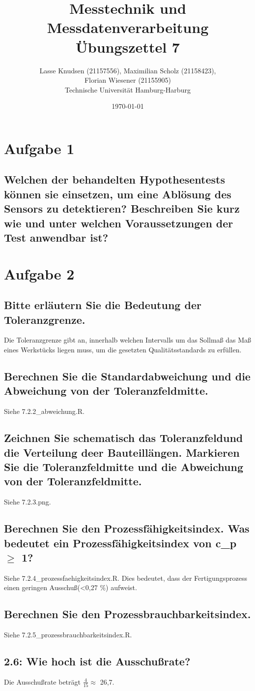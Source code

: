 \documentclass[12pt, a4paper, titlepage]{article}
\title{Messtechnik und Messdatenverarbeitung \\ \"Ubungszettel 7}
\author{Lasse Knudsen (21157556), Maximilian Scholz (21158423), \\
	Florian Wiesener (21155905)  \\
	Technische Universit\"at Hamburg-Harburg \\
}
\date{\today}
\begin{document}
	\maketitle
	 \section{Aufgabe 1}
	 \label{sec:a1}
	 \subsection{Welchen der behandelten Hypothesentests k\"onnen sie einsetzen, um eine Abl\"osung des Sensors zu
	 	detektieren? Beschreiben Sie kurz wie und unter welchen Voraussetzungen der Test anwendbar ist?}
	
	\section{Aufgabe 2}

	\subsection{Bitte erl\"autern Sie die Bedeutung der Toleranzgrenze.}
	Die Toleranzgrenze gibt an, innerhalb welchen Intervalls um das Sollmaß das Maß eines Werkstücks liegen muss,
	um die gesetzten Qualitätsstandards zu erfüllen.

	\subsection{Berechnen Sie die Standardabweichung und die Abweichung von der Toleranzfeldmitte.}
	Siehe 7.2.2\_abweichung.R.
	
	\subsection{Zeichnen Sie schematisch das Toleranzfeldund die Verteilung deer Bauteill\"angen. Markieren Sie die
		Toleranzfeldmitte und die Abweichung von der Toleranzfeldmitte.}
	Siehe 7.2.3.png.
	
	\subsection{Berechnen Sie den Prozessf\"ahigkeitsindex. Was bedeutet ein Prozessf\"ahigkeitsindex von c_p $\ge$ 1?}
	Siehe 7.2.4\_prozessfaehigkeitsindex.R.
	Dies bedeutet, dass der Fertigungsprozess einen geringen Ausschu\ss  (<0,27 $\%$) aufweist.
	
	\subsection{Berechnen Sie den Prozessbrauchbarkeitsindex.}
	Siehe 7.2.5\_prozessbrauchbarkeitsindex.R.

	\subsection{2.6: Wie hoch ist die Ausschu\ss rate?}
	Die Ausschu\ss rate betr\"agt $\frac{4}{15} \approx$ 26,7.
	
\end{document}

